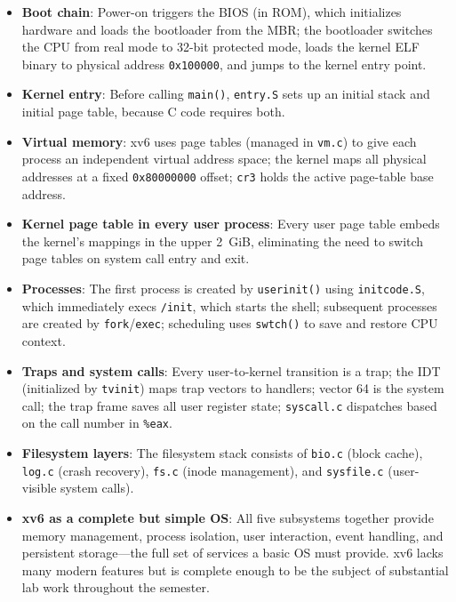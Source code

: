 \documentclass[11pt]{article}
\begin{document}
\begin{itemize}
    \item \textbf{Boot chain}: Power-on triggers the BIOS (in ROM), which initializes hardware and loads the bootloader from the MBR; the bootloader switches the CPU from real mode to 32-bit protected mode, loads the kernel ELF binary to physical address \texttt{0x100000}, and jumps to the kernel entry point.
    \item \textbf{Kernel entry}: Before calling \texttt{main()}, \texttt{entry.S} sets up an initial stack and initial page table, because C code requires both.
    \item \textbf{Virtual memory}: xv6 uses page tables (managed in \texttt{vm.c}) to give each process an independent virtual address space; the kernel maps all physical addresses at a fixed \texttt{0x80000000} offset; \texttt{cr3} holds the active page-table base address.
    \item \textbf{Kernel page table in every user process}: Every user page table embeds the kernel's mappings in the upper 2~GiB, eliminating the need to switch page tables on system call entry and exit.
    \item \textbf{Processes}: The first process is created by \texttt{userinit()} using \texttt{initcode.S}, which immediately execs \texttt{/init}, which starts the shell; subsequent processes are created by \texttt{fork}/\texttt{exec}; scheduling uses \texttt{swtch()} to save and restore CPU context.
    \item \textbf{Traps and system calls}: Every user-to-kernel transition is a trap; the IDT (initialized by \texttt{tvinit}) maps trap vectors to handlers; vector 64 is the system call; the trap frame saves all user register state; \texttt{syscall.c} dispatches based on the call number in \texttt{\%eax}.
    \item \textbf{Filesystem layers}: The filesystem stack consists of \texttt{bio.c} (block cache), \texttt{log.c} (crash recovery), \texttt{fs.c} (inode management), and \texttt{sysfile.c} (user-visible system calls).
    \item \textbf{xv6 as a complete but simple OS}: All five subsystems together provide memory management, process isolation, user interaction, event handling, and persistent storage---the full set of services a basic OS must provide. xv6 lacks many modern features but is complete enough to be the subject of substantial lab work throughout the semester.
\end{itemize}
\end{document}
